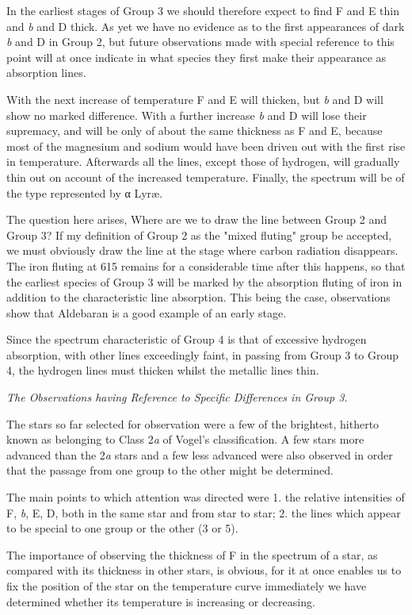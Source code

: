 \documentclass[a4paper, 12pt, oneside, polutonikogreek, english]{article}
\begin{document}
In the earliest stages of Group 3 we should therefore expect to find F and E thin and \emph{b} and D thick. As yet we have no evidence as to the first appearances of dark \emph{b} and D in Group 2, but future observations made with special reference to this point will at once indicate in what species they first make their appearance as absorption lines.

With the next increase of temperature F and E will thicken, but \emph{b} and D will show no marked difference. With a further increase \emph{b} and D will lose their supremacy, and will be only of about the same thickness as F and E, because most of the magnesium and sodium would have been driven out with the first rise in temperature. Afterwards all the lines, except those of hydrogen, will gradually thin out on account of the increased temperature. Finally, the spectrum will be of the type represented by α Lyræ.

The question here arises, Where are we to draw the line between Group 2 and Group 3? If my definition of Group 2 as the "mixed fluting" group be accepted, we must obviously draw the line at the stage where carbon radiation disappears. The iron fluting at 615 remains for a considerable time after this happens, so that the earliest species of Group 3 will be marked by the absorption fluting of iron in addition to the characteristic line absorption. This being the case, observations show that Aldebaran is a good example of an early stage.

Since the spectrum characteristic of Group 4 is that of excessive hydrogen absorption, with other lines exceedingly faint, in passing from Group 3 to Group 4, the hydrogen lines must thicken whilst the metallic lines thin.

\emph{The Observations having Reference to Specific Differences in Group 3.}

The stars so far selected for observation were a few of the brightest, hitherto known as belonging to Class 2\emph{a} of Vogel's classification. A few stars more advanced than the 2\emph{a} stars and a few less advanced were also observed in order that the passage from one group to the other might be determined.

The main points to which attention was directed were 1. the relative intensities of F, \emph{b}, E, D, both in the same star and from star to star; 2. the lines which appear to be special to one group or the other (3 or 5).

The importance of observing the thickness of F in the spectrum of a star, as compared with its thickness in other stars, is obvious, for it at once enables us to fix the position of the star on the temperature curve immediately we have determined whether its temperature is increasing or decreasing.
\end{document}
